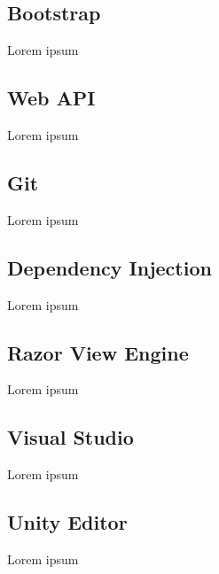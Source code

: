 \subsection*{Bootstrap}
Lorem ipsum
\subsection*{Web API}
Lorem ipsum
\subsection*{Git}
Lorem ipsum
\subsection*{Dependency Injection}
Lorem ipsum
\subsection*{Razor View Engine}
Lorem ipsum
\subsection*{Visual Studio}
Lorem ipsum
\subsection*{Unity Editor}
Lorem ipsum

